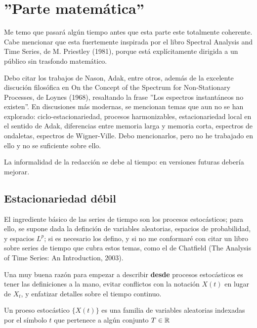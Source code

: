 \documentclass[12pt,a4paper]{mitthesis}
\begin{document}
\chapter{''Parte matem\'atica''}

Me temo que pasar\'a alg\'un tiempo antes que esta parte este totalmente coherente. Cabe mencionar
que esta fuertemente inspirada por el libro Spectral Analysis and Time Series, 
de M. Priestley (1981), porque est\'a expl\'icitamente dirigida a un p\'ublico sin trasfondo
matem\'atico.

Debo citar los trabajos de Nason, Adak, entre otros, adem\'as de la excelente discuci\'on
filos\'ofica en On the Concept of the Spectrum for Non-Stationary Processes, 
de Loynes (1968), resaltando la frase ''Los espectros instant\'aneos no existen''.
En discusiones m\'as modernas, se mencionan temas que aun no se han explorado:
ciclo-estacionariedad, procesos harmonizables, estacionariedad local en el sentido de Adak,
diferencias entre memoria larga y memoria corta, espectros de ondaletas, espectros de
Wigner-Ville. Debo mencionarlos, pero no he trabajado en ello y no se suficiente sobre ello.


La informalidad de la redacci\'on se debe al tiempo: en versiones futuras deber\'ia mejorar.


\section{Estacionariedad d\'ebil}

El ingrediente b\'asico de las series de tiempo son los procesos estoc\'asticos; para ello, se
supone dada la definci\'on de variables aleatorias, espacios de probabilidad, y espacios $L^{p}$;
si es necesario los defino, y si no me conformar\'e con citar un libro sobre series de tiempo
que cubra estos temas,
como el de Chatfield (The Analysis of Time Series: An Introduction, 2003).

Una muy buena raz\'on para empezar a describir \textbf{desde} procesos estoc\'asticos es tener
las definiciones a la mano, evitar conflictos con la notaci\'on $X(t)$ en lugar de $X_t$, y
enfatizar detalles sobre el tiempo continuo.

\begin{defn}
Un proeso estoc\'astico $\{ X(t) \}$ es una familia de variables aleatorias indexadas por el 
s\'imbolo $t$ que pertenece a alg\'un conjunto $T \in \mathbb{R}$
\end{defn}
\end{document}
